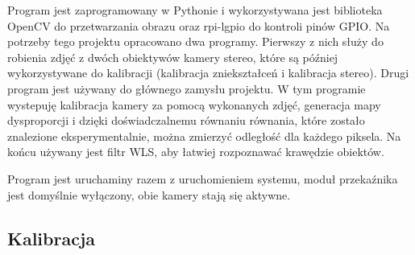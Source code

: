 \documentclass[magisterska]{pracadypl}
\begin{document}
Program jest zaprogramowany w Pythonie i wykorzystywana jest biblioteka OpenCV do przetwarzania obrazu oraz rpi-lgpio do kontroli pinów GPIO.
 Na potrzeby tego projektu opracowano dwa programy.
Pierwszy z nich służy do robienia zdjęć z dwóch obiektywów kamery stereo, które są później wykorzystywane do kalibracji (kalibracja zniekształceń i kalibracja stereo).
Drugi program jest używany do głównego zamysłu projektu.
W tym programie wystepuję kalibracja kamery za pomocą wykonanych zdjęć, generacja mapy dysproporcji i dzięki doświadczalnemu równaniu równania, które zostało znalezione eksperymentalnie, można zmierzyć odległość dla każdego piksela. Na końcu używany jest filtr WLS, aby łatwiej rozpoznawać krawędzie obiektów.

Program jest uruchaminy razem z uruchomieniem systemu, moduł przekaźnika jest domyślnie wyłączony, obie kamery stają się aktywne.

\subsection{Kalibracja}
\end{document}
